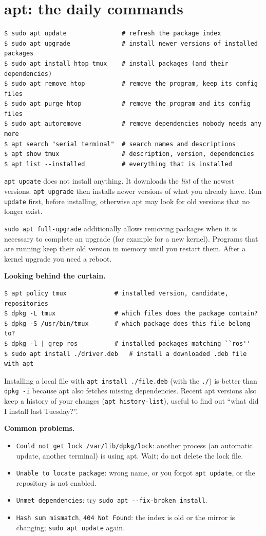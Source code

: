 \section*{apt: the daily commands}
\begin{verbatim}
$ sudo apt update               # refresh the package index
$ sudo apt upgrade              # install newer versions of installed packages
$ sudo apt install htop tmux    # install packages (and their dependencies)
$ sudo apt remove htop          # remove the program, keep its config files
$ sudo apt purge htop           # remove the program and its config files
$ sudo apt autoremove           # remove dependencies nobody needs any more
$ apt search "serial terminal"  # search names and descriptions
$ apt show tmux                 # description, version, dependencies
$ apt list --installed          # everything that is installed
\end{verbatim}
\begin{keyidea}
\texttt{apt update} does not install anything. It downloads the \emph{list} of the newest versions. \texttt{apt upgrade} then installs newer versions of what you already have. Run \texttt{update} first, before installing, otherwise apt may look for old versions that no longer exist.
\end{keyidea}
\texttt{sudo apt full-upgrade} additionally allows removing packages when it is necessary to complete an upgrade (for example for a new kernel). Programs that are running keep their old version in memory until you restart them. After a kernel upgrade you need a reboot.

\textbf{Looking behind the curtain.}
\begin{verbatim}
$ apt policy tmux             # installed version, candidate, repositories
$ dpkg -L tmux                # which files does the package contain?
$ dpkg -S /usr/bin/tmux       # which package does this file belong to?
$ dpkg -l | grep ros          # installed packages matching ``ros''
$ sudo apt install ./driver.deb   # install a downloaded .deb file with apt
\end{verbatim}
Installing a local file with \verb|apt install ./file.deb| (with the \verb|./|) is better than \verb|dpkg -i| because apt also fetches missing dependencies. Recent apt versions also keep a history of your changes (\verb|apt history-list|), useful to find out ``what did I install last Tuesday?''.

\textbf{Common problems.}
\begin{itemize}[nosep]
  \item \texttt{Could not get lock /var/lib/dpkg/lock}: another process (an automatic update, another terminal) is using apt. Wait; do not delete the lock file.
  \item \texttt{Unable to locate package}: wrong name, or you forgot \texttt{apt update}, or the repository is not enabled.
  \item \texttt{Unmet dependencies}: try \verb|sudo apt --fix-broken install|.
  \item \texttt{Hash sum mismatch}, \texttt{404 Not Found}: the index is old or the mirror is changing; \verb|sudo apt update| again.
\end{itemize}

